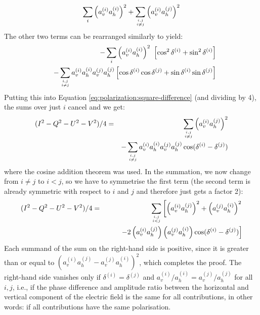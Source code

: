 \begin{equation}
  \sum_i \left(a_v^{(i)}a_h^{(i)}\right)^2
  + \sum_{{i,j}\atop{i\not=j}} \left(a_v^{(i)}a_h^{(j)}\right)^2
\end{equation}
The other two terms can be rearranged similarly to yield:
\begin{eqnarray}
 &&- \sum_i \left( a_v^{(i)} a_h^{(i)} \right)^2 \
           \left[\cos^2\delta^{(i)} + \sin^2\delta^{(i)} \right]\\ \nonumber
 &&- \sum_{{i,j}\atop{i\not=j}} a_v^{(i)} a_h^{(i)} a_v^{(j)} a_h^{(j)} 
    \left[\cos\delta^{(i)}\cos\delta^{(j)}  
          + \sin\delta^{(i)}\sin\delta^{(j)} \right] 
\end{eqnarray}
Putting this into Equation \ref{eq:polarization:square-difference} (and
dividing by 4), the sums over just $i$ cancel and we get:
\begin{eqnarray}
\label{eq:polarization:square-difference2}  
(I^2 - Q^2 - U^2 - V^2)/4 &=&
  \sum_{{i,j}\atop{i\not=j}} \left(a_v^{(i)}a_h^{(j)}\right)^2\\ \nonumber
 &&- \sum_{{i,j}\atop{i\not=j}} a_v^{(i)} a_h^{(i)} a_v^{(j)} a_h^{(j)} 
    \cos(\delta^{(i)}-\delta^{(j)}) 
\end{eqnarray}
where the cosine addition theorem was used.  In the summation, we now
change from $i \not= j$ to $i<j$, so we have to symmetrise the first
term (the second term is already symmetric with respect to $i$ and $j$ and
therefore just gets a factor 2):
\begin{eqnarray}
\label{eq:polarization:square-difference3}  
(I^2 - Q^2 - U^2 - V^2)/4 &=&
  \sum_{{i,j}\atop{i<j}}\left[ 
   \left(a_v^{(i)}a_h^{(j)}\right)^2
   +\left(a_v^{(j)}a_h^{(i)}\right)^2 \right. \\ \nonumber
 &&\qquad\left.
 - 2 \left(a_v^{(i)} a_h^{(j)} \right) \left(a_v^{(j)} a_h^{(i)}\right) 
    \cos(\delta^{(i)}-\delta^{(j)}) \right]
\end{eqnarray}
Each summand of the sum on the right-hand side is positive, since it
is greater than or equal to $(a_v^{(i)}a_h^{(j)} -
a_v^{(j)}a_h^{(i)})^2$, which completes the proof.
The right-hand side vanishes only if $\delta^{(i)}=\delta^{(j)}$ and
$a_v^{(i)}/a_h^{(i)} = a_v^{(j)}/a_h^{(j)}$ for all $i,j$, i.e., if
the phase difference and amplitude ratio between the horizontal and
vertical component of the electric field is the same for all
contributions, in other words: if all contributions have the same
polarisation.

